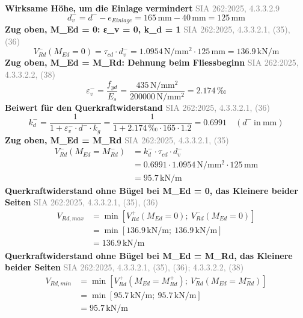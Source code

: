 \documentclass[11pt,a4paper]{article}
\newcommand{\normref}[1]{{\small\textcolor{gray}{#1}}}
\begin{document}
\noindent\textbf{Wirksame Höhe, um die Einlage vermindert} \hfill \normref{SIA 262:2025, 4.3.3.2.9}
\begin{equation*}
d_v^{-} = d^{-} - e_{Einlage} = 165\,\mathrm{mm} - 40\,\mathrm{mm} = 125\,\mathrm{mm}
\end{equation*}
\noindent\textbf{Zug oben, M\_Ed = 0: ε\_v = 0, k\_d = 1} \hfill \normref{SIA 262:2025, 4.3.3.2.1, (35), (36)}
\begin{equation*}
V_{Rd}^{-}(M_{Ed} = 0) = \tau_{cd} \cdot d_v^{-} = 1.0954\,\mathrm{N}/\mathrm{mm}^{2} \cdot 125\,\mathrm{mm} = 136.9\,\mathrm{kN}/\mathrm{m}
\end{equation*}
\noindent\textbf{Zug oben, M\_Ed = M\_Rd: Dehnung beim Fliessbeginn} \hfill \normref{SIA 262:2025, 4.3.3.2.2, (38)}
\begin{equation*}
\varepsilon_v^{-} = \frac{f_{yd}}{E_s} = \frac{435\,\mathrm{N}/\mathrm{mm}^{2}}{200000\,\mathrm{N}/\mathrm{mm}^{2}} = 2.174\,\text{‰}
\end{equation*}
\noindent\textbf{Beiwert für den Querkraftwiderstand} \hfill \normref{SIA 262:2025, 4.3.3.2.1, (36)}
\begin{equation*}
k_d^{-} = \frac{1}{1 + \varepsilon_v^{-} \cdot d^{-} \cdot k_g} = \frac{1}{1 + 2.174\,\text{‰} \cdot 165 \cdot 1.2} = 0.6991 \quad \left(d^{-}\ \text{in}\ \mathrm{mm}\right)
\end{equation*}
\noindent\textbf{Zug oben, M\_Ed = M\_Rd} \hfill \normref{SIA 262:2025, 4.3.3.2.1, (35)}
\begin{equation*}
\begin{aligned}
  V_{Rd}^{-}(M_{Ed} = M_{Rd}^{-}) &= k_d^{-} \cdot \tau_{cd} \cdot d_v^{-} \\
  &= 0.6991 \cdot 1.0954\,\mathrm{N}/\mathrm{mm}^{2} \cdot 125\,\mathrm{mm} \\
  &= 95.7\,\mathrm{kN}/\mathrm{m}
\end{aligned}
\end{equation*}
\noindent\textbf{Querkraftwiderstand ohne Bügel bei M\_Ed = 0, das Kleinere beider Seiten} \hfill \normref{SIA 262:2025, 4.3.3.2.1, (35), (36)}
\begin{equation*}
\begin{aligned}
  V_{Rd,max} &= \min\left[V_{Rd}^{+}(M_{Ed} = 0);\ V_{Rd}^{-}(M_{Ed} = 0)\right] \\
  &= \min\left[136.9\,\mathrm{kN}/\mathrm{m};\ 136.9\,\mathrm{kN}/\mathrm{m}\right] \\
  &= 136.9\,\mathrm{kN}/\mathrm{m}
\end{aligned}
\end{equation*}
\noindent\textbf{Querkraftwiderstand ohne Bügel bei M\_Ed = M\_Rd, das Kleinere beider Seiten} \hfill \normref{SIA 262:2025, 4.3.3.2.1, (35), (36); 4.3.3.2.2, (38)}
\begin{equation*}
\begin{aligned}
  V_{Rd,min} &= \min\left[V_{Rd}^{+}(M_{Ed} = M_{Rd}^{+});\ V_{Rd}^{-}(M_{Ed} = M_{Rd}^{-})\right] \\
  &= \min\left[95.7\,\mathrm{kN}/\mathrm{m};\ 95.7\,\mathrm{kN}/\mathrm{m}\right] \\
  &= 95.7\,\mathrm{kN}/\mathrm{m}
\end{aligned}
\end{equation*}
\end{document}
